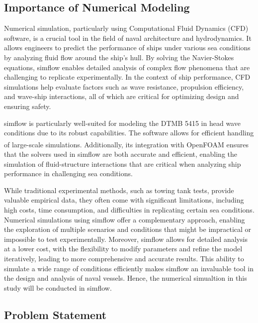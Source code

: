 \documentclass[12pt]{article} %
\begin{document}
\subsection{Importance of Numerical Modeling}
Numerical simulation, particularly using Computational Fluid Dynamics (CFD) software, is a 
crucial tool in the field of naval architecture and hydrodynamics. It allows engineers to 
predict the performance of ships under various sea conditions by analyzing fluid flow around 
the ship's hull. 
By solving the Navier-Stokes equations, simflow enables detailed analysis of complex flow 
phenomena that are challenging to replicate experimentally. In the context of ship performance, 
CFD simulations help evaluate factors such as wave resistance, propulsion efficiency, 
and wave-ship interactions, all of which are critical for optimizing design and ensuring safety.

simflow is particularly well-suited for modeling the DTMB 5415 in head wave conditions due to its 
robust capabilities. The software allows for efficient handling of large-scale 
simulations. Additionally, its integration with OpenFOAM\textsuperscript{\textregistered} ensures 
that the solvers used in simflow are both accurate and efficient, enabling the simulation of 
fluid-structure interactions that are critical when analyzing ship performance in challenging 
sea conditions.

While traditional experimental methods, such as towing tank tests, provide valuable empirical data, 
they often come with significant limitations, including high costs, time consumption, 
and difficulties in replicating certain sea conditions. Numerical simulations using simflow 
offer a complementary approach, enabling the exploration of multiple scenarios and conditions 
that might be impractical or impossible to test experimentally. Moreover, simflow allows for 
detailed analysis at a lower cost, with the flexibility to modify parameters and refine the 
model iteratively, leading to more comprehensive and accurate results. This ability to simulate 
a wide range of conditions efficiently makes simflow an invaluable tool in the design and analysis 
of naval vessels. Hence, the numerical simualtion in this study will be conducted in simflow.

\subsection{Problem Statement}
\end{document}
